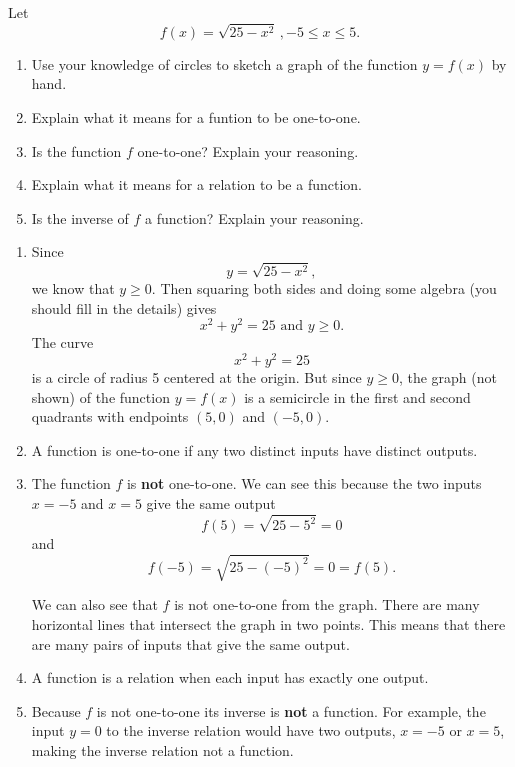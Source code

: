 \documentclass{ximera}
\begin{document}
\begin{example}     \label{Ex99:fefQuadratics}
Let 
\[
   f(x) = \sqrt{25-x^2} \, , -5 \leq x \leq 5 .
\]

\begin{enumerate}
\item Use your knowledge of circles to sketch a graph of the function $y=f(x)$ by hand.

\item Explain what it means for a funtion to be one-to-one.

\item Is the function $f$ one-to-one? Explain your reasoning.

\item Explain what it means for a relation to be a function.

\item Is the inverse of $f$ a function? Explain your reasoning.

\end{enumerate}

\begin{explanation}
\begin{enumerate}
\item Since 
\[
    y = \sqrt{25-x^2},
\]
we know that $y \geq 0$. Then squaring both sides and doing some algebra (you should fill in the details) gives
\[
    x^2 + y^2 =25 \text{ and } y\geq 0.
\]
The curve 
\[
   x^2 + y^2 = 25
\]
is a circle of radius 5 centered at the origin. But since $y\geq 0$, the graph (not shown) of the function $y=f(x)$ is a semicircle in the first and second quadrants with endpoints $(5,0)$ and $(-5,0)$.

\item A function is one-to-one if any two distinct inputs have distinct outputs.

\item The function $f$ is {\bf not} one-to-one. We can see this because the two inputs $x=-5$ and $x=5$ give the same output
\[
     f(5) = \sqrt{25-5^2} = 0 
\]
and
\[
     f(-5) = \sqrt{25-(-5)^2} = 0 = f(5). 
\]

We can also see that $f$ is not one-to-one from the graph. There are many horizontal lines that intersect the graph in two points. This means that there are many pairs of inputs that give the same output.

\item A function is a relation when each input has exactly one output.

\item Because $f$ is not one-to-one its inverse is {\bf not} a function. For example, the input $y=0$ to the inverse relation would have two outputs, $x=-5$ or $x=5$, making the inverse relation not a function.

\end{enumerate}

\end{explanation}
\end{example}
\end{document}
